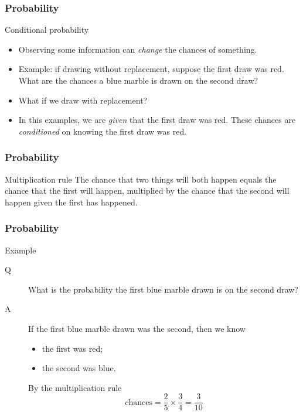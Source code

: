 \documentclass[handout]{beamer}
\begin{document}

   \begin{frame} \frametitle{Probability}

   \begin{block}
   {Conditional probability}
   \begin{itemize}
     \item Observing some information can {\em change} the chances
     of something.
     \item Example: if drawing without replacement, suppose
     the first draw was red. What are the chances
     a blue marble is drawn on the second draw?
     \item What if we draw with replacement?
     \item In this examples, we are {\em given} that the
     first draw was red. These chances are {\em conditioned}
     on knowing the first draw was red.
   \end{itemize}
   \end{block}
   \end{frame}


   \begin{frame} \frametitle{Probability}

   \begin{block}
   {Multiplication rule}
   The chance that two things will both happen equals
   the chance that the first will happen, multiplied
   by the chance that the second will happen given the
   first has happened.
   \end{block}
   \end{frame}


   \begin{frame} \frametitle{Probability}

   \begin{block}
   {Example}
   \begin{description}
   \item[Q] What is the probability the first blue marble drawn
   is on the second draw?
   \item[A] If the first blue marble drawn was the second, then we know
     \begin{itemize}
     \item the first was red;

     \item the second was blue.
     \end{itemize}
     By the multiplication rule
     $$
     \text{chances} = \frac{2}{5} \times \frac{3}{4} = \frac{3}{10}
     $$
   \end{description}
   \end{block}
   \end{frame}
\end{document}
